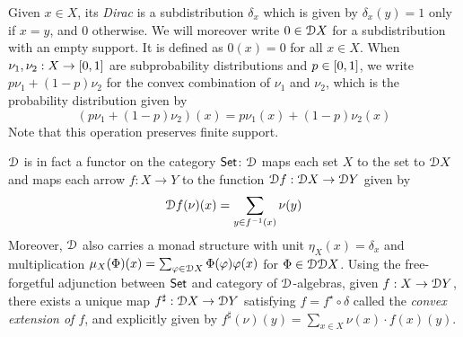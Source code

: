  Given $x \in X$, its \emph{Dirac} is a subdistribution $\delta_x$ which is given by $\delta_x(y)=1$ only if $x=y$, and $0$ otherwise. We will moreover write $0 \in \mathcal{D} X$ for a subdistribution with an empty support. It is defined as $0(x)=0$ for all $x \in X$. When $\nu_1, \nu_2 : X \to \interval{0}{1}$ are subprobability distributions and $p \in \interval{0}{1}$, we write $p\nu_1 + (1-p)\nu_2$ for the convex combination of $\nu_1$ and $\nu_2$, which is the probability distribution given by $$(p\nu_1 + (1-p)\nu_2)(x) = p\nu_1(x) + (1-p)\nu_2(x)$$
 Note that this operation preserves finite support. 
 
  $\mathcal{D}$ is in fact a functor on the category ${\mathsf{Set}}$: $\mathcal{D}$ maps each set $X$ to the set to $\mathcal{D} X$ and maps each arrow $f : X \to Y$ to the function $\mathcal{D} f : \mathcal{D} X \to \mathcal{D} Y$ given by $$\mathcal{D} f (\nu)(x) = \sum_{y \in f^{-1}(x)} \nu(y)$$
   Moreover, $\mathcal{D}$ also  carries a monad structure with unit  $\eta_X(x) = \delta_x$ and multiplication $\mu_X(\Phi)(x) = \sum_{\varphi \in \mathcal{D} X }\Phi(\varphi)\varphi(x)$ for $\Phi \in \mathcal{D} \mathcal{D} X$. Using the free-forgetful adjunction between ${\mathsf{Set}}$ and category of $\mathcal{D}$-algebras, given $f : X \to \mathcal{D} Y$, there exists a unique map $f^\sharp : \mathcal{D} X \to \mathcal{D} Y$ satisfying $f = f^\star \circ \delta$ called the \emph{convex extension of $f$}, and explicitly given by $f^\sharp(\nu)(y) = \sum_{x \in X} \nu(x) \cdot f(x)(y)$.

 